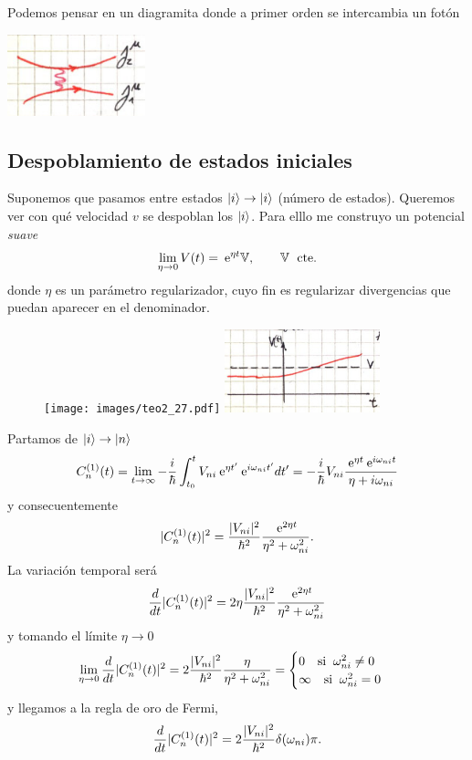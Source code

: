 \documentclass[10pt,oneside]{CBFT_book}
\begin{document}
Podemos pensar en un diagramita donde a primer orden se intercambia un fotón

\includegraphics[width=0.3\textwidth]{images/fig_ft2_desdoblamiento_2b.jpg}

\subsection{Despoblamiento de estados iniciales}

Suponemos que pasamos entre estados $\Ket{i} \to \Ket{i}$ (número de estados).
Queremos ver con qué velocidad $v$ se despoblan los $\Ket{i}$. 
Para elllo me construyo un potencial {\it suave}
\[
	\lim_{\eta\to 0} V(t) = \:\mathrm{e}^{\eta t} \mathbb{V}, \qquad  \mathbb{V} \; \text{ cte.}
\]
donde $\eta$ es un parámetro regularizador, cuyo fin es regularizar divergencias que
puedan aparecer en el denominador.

\begin{figure}[htb]
	\begin{center}
	\texttt{[image: images/teo2\_27.pdf]}
	\includegraphics[width=0.4\textwidth]{images/fig_ft2_desdoblamiento_3.jpg}
	\end{center}
	\caption{}
\end{figure} 

Partamos de $ \Ket{i} \to \Ket{n} $
\[
	C_n^{(1)}(t) = \lim_{t\to\infty} -\frac{i}{\hbar} 
	\int_{t_0}^t V_{ni} \:\mathrm{e}^{\eta t'} \:\mathrm{e}^{i\omega_{ni} t'} dt' =
	-\frac{i}{\hbar} V_{ni} 
	\frac{\:\mathrm{e}^{\eta t} \:\mathrm{e}^{i\omega_{ni} t} }{\eta+i\omega_{ni}}
\]
y consecuentemente
\[
 	|C_n^{(1)}(t)|^2 = \frac{|V_{ni}|^2}{\hbar^2} 
 	\frac{\:\mathrm{e}^{2\eta t} }{\eta^2 + \omega_{ni}^2 }.
\]
La variación temporal será
\[
	\frac{d^{\hspace{-0.05em}} {}}{d {t}^{\hspace{-0.05em}}}|C_n^{(1)}(t)|^2 = 2 \eta \frac{|V_{ni}|^2}{\hbar^2} \frac{\:\mathrm{e}^{2\eta t} }{\eta^2 + \omega_{ni}^2 }
\]
y tomando el límite $\eta \to 0$ 
\[
	\lim_{\eta\to 0} \frac{d^{\hspace{-0.05em}} {}}{d {t}^{\hspace{-0.05em}}}|C_n^{(1)}(t)|^2 = 2 \frac{|V_{ni}|^2}{\hbar^2} 
			\frac{\eta }{\eta^2 + \omega_{ni}^2 } = \begin{cases}
	                    0 \quad \text{si}\;\; \omega_{ni}^2 \neq 0 \\
	                    \infty \quad \text{si}\;\; \omega_{ni}^2 = 0
	                   \end{cases}
\]
y llegamos a la regla de oro de Fermi,
\[
	\frac{d^{\hspace{-0.05em}} {}}{d {t}^{\hspace{-0.05em}}}|C_n^{(1)}(t)|^2 = 2 \frac{|V_{ni}|^2}{\hbar^2} \delta(\omega_{ni}) \pi.
\]
\end{document}

